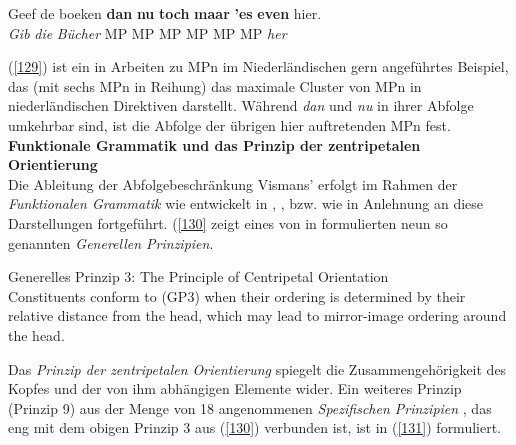 \begin{exe}
	\ex\label{129} 
	\gll Geef de boeken \textbf{dan} \textbf{nu} \textbf{toch} \textbf{maar} \textbf{'es} \textbf{even} hier.\\
	\textit{Gib} \textit{die} \textit{Bücher} MP MP MP MP MP MP \textit{her}\\
	\hfill\hbox{\citet[98]{Hoogvliet1903}}	
\end{exe}		
(\ref{129}) ist ein in Arbeiten zu MPn im Niederländischen gern angeführtes Beispiel, das (mit sechs MPn in Reihung) das maximale Cluster von MPn in niederländi\-schen Direktiven darstellt. Während \textit{dan} und \textit{nu} in ihrer Abfolge umkehrbar sind, ist die Abfolge der übrigen hier auftretenden MPn fest.\\
\newline
\noindent
\textbf{Funktionale Grammatik und das Prinzip der zentripetalen Orientierung}\\
Die Ableitung der Abfolgebeschränkung Vismans’ erfolgt im Rahmen der \textit{Funktionalen Grammatik}  wie entwickelt in \citet{Dik1978}, \citet{Dik1989}, \citet{Dik1997} bzw. wie in Anlehnung an diese Darstellungen fortgeführt. (\ref{130} zeigt eines von in \citet[Kapitel 16]{Dik1997} formulierten neun so genannten \textit{Generellen Prinzipien}.

\begin{exe}
	\ex\label{130} 
			Generelles Prinzip 3: The Principle of Centripetal Orientation\\
	Constituents conform to (GP3) when their ordering is determined by their relative distance from the head, which may lead to \glqq mirror-image\grqq{}		ordering around the head.
			\hbox{}\hfill\hbox{\citet[401]{Dik1997}}	
\end{exe}
Das \textit{Prinzip der zentripetalen Orientierung}  spiegelt die Zusammengehörigkeit des Kopfes und der von ihm abhängigen Elemente wider. Ein weiteres Prinzip (Prinzip 9) aus der Menge von 18 angenommenen \textit{Spezifischen Prinzipien} , das eng mit dem obigen Prinzip 3 aus (\ref{130}) verbunden ist, ist in (\ref{131}) formuliert.

